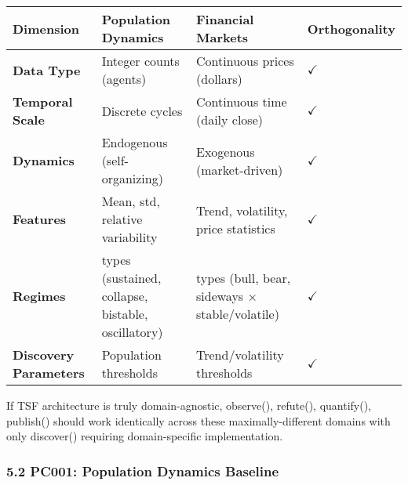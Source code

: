 \documentclass[
]{article}
\newcounter{none} %
\begin{document}
{\def\LTcaptype{none} %
\begin{longtable}[]{@{}
  >{\raggedright\arraybackslash}p{}
  >{\raggedright\arraybackslash}p{}
  >{\raggedright\arraybackslash}p{}
  >{\raggedright\arraybackslash}p{}@{}}
\toprule\noalign{}
\begin{minipage}[b]{\linewidth}\raggedright
Dimension
\end{minipage} & \begin{minipage}[b]{\linewidth}\raggedright
Population Dynamics
\end{minipage} & \begin{minipage}[b]{\linewidth}\raggedright
Financial Markets
\end{minipage} & \begin{minipage}[b]{\linewidth}\raggedright
Orthogonality
\end{minipage} \\
\midrule\noalign{}
\endhead
\bottomrule\noalign{}
\endlastfoot
\textbf{Data Type} & Integer counts (agents) & Continuous prices
(dollars) & $\checkmark$ \\
\textbf{Temporal Scale} & Discrete cycles & Continuous time (daily
close) & $\checkmark$ \\
\textbf{Dynamics} & Endogenous (self-organizing) & Exogenous
(market-driven) & $\checkmark$ \\
\textbf{Features} & Mean, std, relative variability & Trend, volatility,
price statistics & $\checkmark$ \\
\textbf{Regimes} & 5 types (sustained, collapse, bistable, oscillatory)
& 6 types (bull, bear, sideways × stable/volatile) & $\checkmark$ \\
\textbf{Discovery Parameters} & Population thresholds & Trend/volatility
thresholds & $\checkmark$ \\
\end{longtable}
}

If TSF architecture is truly domain-agnostic, observe(), refute(),
quantify(), publish() should work identically across these
maximally-different domains with only discover() requiring
domain-specific implementation.

\subsubsection{5.2 PC001: Population Dynamics
Baseline}\label{pc001-population-dynamics-baseline}
\end{document}
